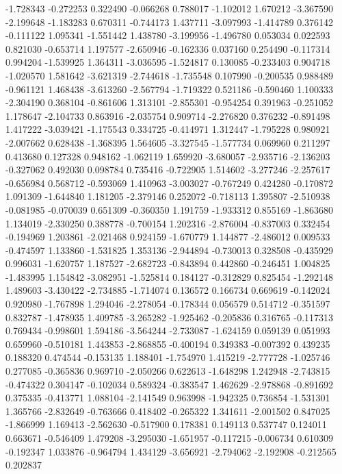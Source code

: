 -1.728343
-0.272253
0.322490
-0.066268
0.788017
-1.102012
1.670212
-3.367590
-2.199648
-1.183283
0.670311
-0.744173
1.437711
-3.097993
-1.414789
0.376142
-0.111122
1.095341
-1.551442
1.438780
-3.199956
-1.496780
0.053034
0.022593
0.821030
-0.653714
1.197577
-2.650946
-0.162336
0.037160
0.254490
-0.117314
0.994204
-1.539925
1.364311
-3.036595
-1.524817
0.130085
-0.233403
0.904718
-1.020570
1.581642
-3.621319
-2.744618
-1.735548
0.107990
-0.200535
0.988489
-0.961121
1.468438
-3.613260
-2.567794
-1.719322
0.521186
-0.590460
1.100333
-2.304190
0.368104
-0.861606
1.313101
-2.855301
-0.954254
0.391963
-0.251052
1.178647
-2.104733
0.863916
-2.035754
0.909714
-2.276820
0.376232
-0.891498
1.417222
-3.039421
-1.175543
0.334725
-0.414971
1.312447
-1.795228
0.980921
-2.007662
0.628438
-1.368395
1.564605
-3.327545
-1.577734
0.069960
0.211297
0.413680
0.127328
0.948162
-1.062119
1.659920
-3.680057
-2.935716
-2.136203
-0.327062
0.492030
0.098784
0.735416
-0.722905
1.514602
-3.277246
-2.257617
-0.656984
0.568712
-0.593069
1.410963
-3.003027
-0.767249
0.424280
-0.170872
1.091309
-1.644840
1.181205
-2.379146
0.252072
-0.718113
1.395807
-2.510938
-0.081985
-0.070039
0.651309
-0.360350
1.191759
-1.933312
0.855169
-1.863680
1.134019
-2.330250
0.388778
-0.700154
1.202316
-2.876004
-0.837003
0.332454
-0.194969
1.203861
-2.021468
0.924159
-1.670779
1.144877
-2.486012
0.009533
-0.474597
1.133860
-1.531825
1.353136
-2.944894
-0.730013
0.328508
-0.435929
0.996031
-1.620757
1.187527
-2.682723
-0.843894
0.442860
-0.246451
1.004825
-1.483995
1.154842
-3.082951
-1.525814
0.184127
-0.312829
0.825454
-1.292148
1.489603
-3.430422
-2.734885
-1.714074
0.136572
0.166734
0.669619
-0.142024
0.920980
-1.767898
1.294046
-2.278054
-0.178344
0.056579
0.514712
-0.351597
0.832787
-1.478935
1.409785
-3.265282
-1.925462
-0.205836
0.316765
-0.117313
0.769434
-0.998601
1.594186
-3.564244
-2.733087
-1.624159
0.059139
0.051993
0.659960
-0.510181
1.443853
-2.868855
-0.400194
0.349383
-0.007392
0.439235
0.188320
0.474544
-0.153135
1.188401
-1.754970
1.415219
-2.777728
-1.025746
0.277085
-0.365836
0.969710
-2.050266
0.622613
-1.648298
1.242948
-2.743815
-0.474322
0.304147
-0.102034
0.589324
-0.383547
1.462629
-2.978868
-0.891692
0.375335
-0.413771
1.088104
-2.141549
0.963998
-1.942325
0.736854
-1.531301
1.365766
-2.832649
-0.763666
0.418402
-0.265322
1.341611
-2.001502
0.847025
-1.866999
1.169413
-2.562630
-0.517900
0.178381
0.149113
0.537747
0.124011
0.663671
-0.546409
1.479208
-3.295030
-1.651957
-0.117215
-0.006734
0.610309
-0.192347
1.033876
-0.964794
1.434129
-3.656921
-2.794062
-2.192908
-0.212565
0.202837
